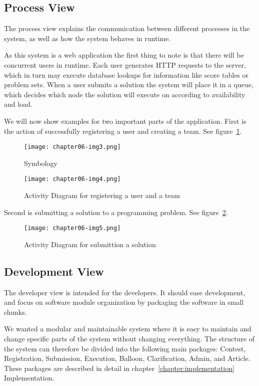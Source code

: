 \subsection{Process View}
The process view explains the communication between different processes
in the system, as well as how the system behaves in runtime. 

As this system is a web application the first thing to note is that
there will be concurrent users in runtime. Each user generates HTTP
requests to the server, which in turn may execute database lookups for
information like score tables or problem sets. When a user submits a
solution the system will place it in a queue, which decides which node
the solution will execute on according to availability and load. 

We will now show examples for two important parts of the application.
First is the action of successfully registering a user and creating a
team. See figure~\ref{fig:actRegister}.
\begin{figure}[h!]
    \centering
	\texttt{[image: chapter06-img3.png]} 
	\caption{Symbology}
\end{figure}

\begin{figure}[h]
	\texttt{[image: chapter06-img4.png]} 
	\caption{Activity Diagram for registering a user and a team}
	\label{fig:actRegister}
\end{figure}

Second is submitting a solution to a programming problem. See figure~\ref{fig:actSubmit}.
\begin{figure}[h]
	\texttt{[image: chapter06-img5.png]}
	\caption{Activity Diagram for submittion a solution}
	\label{fig:actSubmit}
\end{figure}

\subsection{Development View}

The developer view is intended for the developers. It should ease
development, and focus on software module organization by packaging the
software in small chunks.

We wanted a modular and maintainable system where it is easy to maintain
and change specific parts of the system without changing everything.
The structure of the system can therefore be divided into the following
main packages: Contest, Registration, Submission, Execution, Balloon,
Clarification, Admin, and Article. These packages are described in
detail in chapter~\ref{chapter:implementation} Implementation. 

